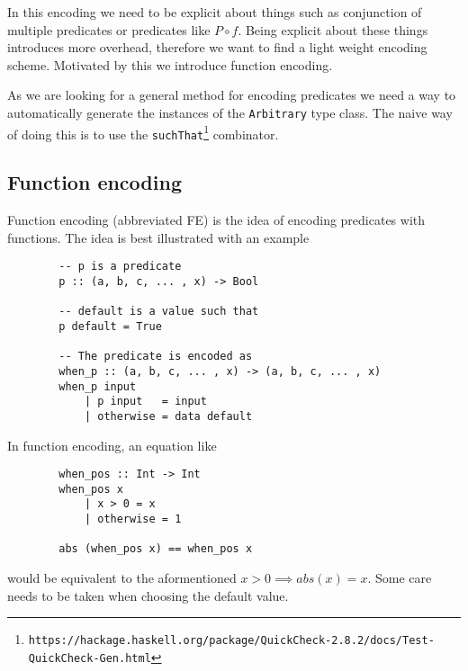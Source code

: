         In this encoding we need to be explicit about things such as conjunction
        of multiple predicates or predicates like $P\circ f$.
        Being explicit about these things introduces more overhead, therefore
        we want to find a light weight encoding scheme. Motivated by this
        we introduce function encoding.

        As we are looking for a general method for encoding predicates we need
        a way to automatically generate the instances of the \texttt{Arbitrary} type class.
        The naive way of doing this is to use the
        \texttt{suchThat}\footnote{\texttt{https://hackage.haskell.org/package/QuickCheck-2.8.2/docs/Test-QuickCheck-Gen.html}} 
        combinator. 

    \subsection{Function encoding}

        Function encoding (abbreviated FE) is the idea of encoding 
        predicates with functions. The idea is best
        illustrated with an example
        \begin{verbatim}
        -- p is a predicate
        p :: (a, b, c, ... , x) -> Bool

        -- default is a value such that
        p default = True

        -- The predicate is encoded as
        when_p :: (a, b, c, ... , x) -> (a, b, c, ... , x)
        when_p input
            | p input   = input
            | otherwise = data default
        \end{verbatim}
        In function encoding, an equation like
        \begin{verbatim}
        when_pos :: Int -> Int
        when_pos x
            | x > 0 = x
            | otherwise = 1

        abs (when_pos x) == when_pos x

        \end{verbatim}
        would be equivalent to the aformentioned $x > 0 \implies abs(x) = x$.
        Some care needs to be taken when choosing the default value.

